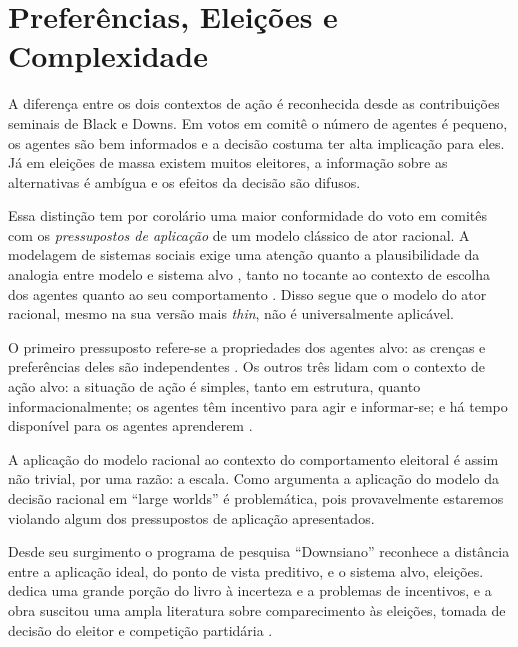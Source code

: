 \section{Preferências, Eleições e Complexidade}


A diferença entre os dois contextos de ação é reconhecida desde as contribuições
seminais de Black e Downs. Em votos em comitê o número de agentes é pequeno, os
agentes são bem informados e  a decisão costuma ter alta implicação para eles.
Já em eleições de massa existem muitos eleitores, a informação sobre as
alternativas é ambígua e os efeitos da decisão são difusos.

Essa distinção tem por corolário uma maior conformidade do voto em comitês com
os \textit{pressupostos de aplicação} de um modelo clássico de ator racional. A
modelagem de sistemas sociais exige uma atenção quanto a plausibilidade da
analogia entre modelo e sistema alvo \cite{de2005computational}, tanto no
tocante ao contexto de escolha dos agentes quanto ao seu comportamento
\cite{page2008uncertainty}. Disso segue que o modelo do ator racional, mesmo na
sua versão mais \textit{thin}, não é universalmente aplicável.


O primeiro pressuposto refere-se a propriedades dos agentes alvo: as crenças e
preferências deles são independentes \cite{binmore2008rational}. Os outros três
lidam com o contexto de ação alvo: a situação de ação é simples, tanto em
estrutura, quanto informacionalmente; os agentes têm incentivo para agir e
informar-se; e há tempo disponível para os agentes aprenderem
\cite{binmore2007work, page2008uncertainty}.

A aplicação do modelo racional ao contexto do comportamento eleitoral é assim
não trivial, por uma razão: a escala. Como argumenta \cite{binmore2008rational}
a aplicação do modelo da decisão racional em  ``large worlds'' é problemática,
pois provavelmente estaremos violando algum dos pressupostos de aplicação
apresentados.

Desde seu surgimento o programa de pesquisa ``Downsiano'' reconhece a distância
entre a aplicação ideal, do ponto de vista preditivo, e o sistema alvo,
eleições.  dedica uma grande porção do livro à
incerteza e a problemas de incentivos, e a obra suscitou uma ampla literatura
sobre comparecimento às eleições, tomada de decisão do eleitor e competição
partidária \cite{bendor2011behavioral}.
